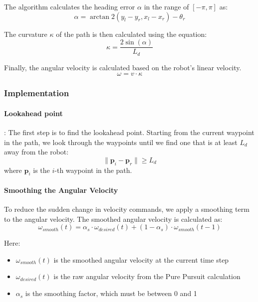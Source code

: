 \documentclass[11pt]{article}
\begin{document}
The algorithm calculates the heading error $\alpha$ in the range of $[-\pi, \pi]$ as:
\begin{equation}
	\alpha = \arctan2(y_l - y_r, x_l - x_r) - \theta_r
\end{equation}


The curvature $\kappa$ of the path is then calculated using the equation:
\begin{equation}
	\kappa = \frac{2 \sin(\alpha)}{L_d}
\end{equation}

Finally, the angular velocity is calculated based on the robot's linear velocity.
\begin{equation}
	\omega = v \cdot \kappa
\end{equation}

\subsubsection{Implementation}

\paragraph{Lookahead point}: The first step is to find the lookahead point. Starting from the current waypoint in the path, we look through the waypoints until we find one that is at least $L_d$ away from the robot:
\begin{equation}
	\|\mathbf{p}_i - \mathbf{p}_r\| \geq L_d
\end{equation}
where $\mathbf{p}_i$ is the $i$-th waypoint in the path.

\paragraph{Smoothing the Angular Velocity}

To reduce the sudden change in velocity commands, we apply a smoothing term to the angular velocity. The smoothed angular velocity is calculated as:
\begin{equation}
	\omega_{smooth}(t) = \alpha_s \cdot \omega_{desired}(t) + (1 - \alpha_s) \cdot \omega_{smooth}(t-1)
\end{equation}

Here:
\begin{itemize}
	\item $\omega_{smooth}(t)$ is the smoothed angular velocity at the current time step
	\item $\omega_{desired}(t)$ is the raw angular velocity from the Pure Pursuit calculation
	\item $\alpha_s$ is the smoothing factor, which must be between 0 and 1
\end{itemize}
\end{document}
